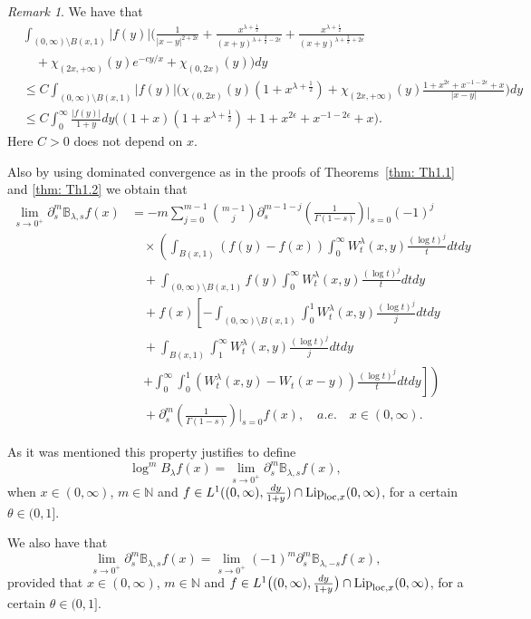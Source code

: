 \documentclass[a4paper,10pt, reqno]{amsart}
\theoremstyle{definition}
\theoremstyle{remark}
\newtheorem{rem}[thm]{Remark}
\numberwithin{equation}{section}
\begin{document}
\begin{rem}
We have that
\begin{align*}
&\int_{(0,\infty)\setminus B(x,1)}|f(y)|\Bigg(\frac{1}{|x-y|^{2+2\epsilon}}+\frac{x^{\lambda+\frac{1}{2}}}{(x+y)^{\lambda+\frac{3}{2}-2\epsilon}}+\frac{x^{\lambda+\frac{1}{2}}}{(x+y)^{\lambda+\frac{3}{2}+2\epsilon}}\\
&\quad+\chi_{(2x,+\infty)}(y)e^{-cy/x}+\chi_{(0,2x)}(y)\Bigg)dy\\
&\le C\int_{(0,\infty)\setminus B(x,1)}|f(y)|\Bigg(\chi_{(0,2x)}(y)(1+x^{\lambda+\frac{1}{2}})+\chi_{(2x,+\infty)}(y)\frac{1+x^{2\epsilon}+x^{-1-2\epsilon}+x}{|x-y|}\Bigg)dy\\
&\le C\int_0^\infty\frac{|f(y)|}{1+y}dy\Big((1+x)(1+x^{\lambda+\frac{1}{2}})+1+x^{2\epsilon}+x^{-1-2\epsilon}+x\Big).
\end{align*}
Here $C>0$ does not depend on $x$.

Also by using dominated convergence as in the proofs of Theorems~\ref{thm: Th1.1} and \ref{thm: Th1.2} we obtain that
\begin{align*}
    \lim_{s\to 0^+}\partial_s^m \mathbb{B}_{\lambda,s}f(x)&=-m\sum_{j=0}^{m-1}\binom{m-1}{j}\partial_s^{m-1-j}\left(\frac{1}{\Gamma (1-s)}\right)\Bigg|_{s=0}(-1)^j\\
    &\quad \times \left(\int_{B(x,1)}(f(y)-f(x))\int_0^\infty W_t^\lambda (x,y)\frac{(\log t)^j}{t}dtdy\right.\\
    &\quad +\int_{(0,\infty)\setminus B(x,1)}f(y)\int_0^\infty W_t^\lambda (x,y)\frac{(\log t)^j}{t}dtdy\\
    &\quad +f(x)\left[-\int_{(0,\infty)\setminus B(x,1)}\int_0^1W_t^\lambda (x,y)\frac{(\log t)^j}{j}dtdy\right.\\
    &\quad +\int_{B(x,1)}\int_1^\infty W_t^\lambda (x,y)\frac{(\log t)^j}{j}dtdy\\
    &\quad \left.\left.+\int_0^\infty\int_0^1(W_t^\lambda (x,y)-W_t(x-y))\frac{(\log t)^j}{t}dtdy\right]\right)\\
    &\quad +\partial_s^{m}\left(\frac{1}{\Gamma (1-s)}\right)\Bigg|_{s=0}f(x),\quad a.e. \quad  x\in (0,\infty).
    \end{align*}

As it was mentioned this property justifies to define
\[
\log^m B_\lambda f(x)=\lim_{s\to 0^+}\partial_s^m \mathbb{B}_{\lambda,s}f(x),
\]
when $x\in (0,\infty)$, $m\in \mathbb{N}$ and $f\in L^1((0,\infty),\frac{dy}{1+y})\cap {\textup{Lip}}_{{\rm loc},x}(0,\infty)$, for a certain $\theta\in (0,1]$.

We also have that
\[
\lim_{s\to 0^+}\partial_s^m \mathbb{B}_{\lambda,s}f(x)=\lim_{s\to 0^+}(-1)^m\partial_s^m \mathbb{B}_{\lambda,-s}f(x),
\]
provided that $x\in (0,\infty)$, $m\in \mathbb{N}$ and $f\in L^1\big((0,\infty),\frac{dy}{1+y}\big)\cap {\textup{Lip}}_{{\rm loc},x}(0,\infty)$, for a certain $\theta\in (0,1]$.
\end{rem}
\end{document}
